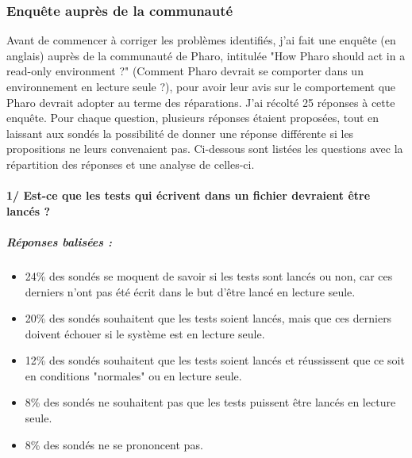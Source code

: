 \subsubsection{Enquête auprès de la communauté}
Avant de commencer à corriger les problèmes identifiés, j'ai fait une enquête (en anglais) auprès de la communauté de Pharo, intitulée "How Pharo should act in a read-only environment ?" (Comment Pharo devrait se comporter dans un environnement en lecture seule ?), pour avoir leur avis sur le comportement que Pharo devrait adopter au terme des réparations. J'ai récolté 25 réponses à cette enquête. Pour chaque question, plusieurs réponses étaient proposées, tout en laissant aux sondés la possibilité de donner une réponse différente si les propositions ne leurs convenaient pas. Ci-dessous sont listées les questions avec la répartition des réponses et une analyse de celles-ci.

\paragraph{1/ Est-ce que les tests qui écrivent dans un fichier devraient être lancés ?}
\subparagraph{Réponses balisées :}
\begin{itemize}
	\item 24\% des sondés se moquent de savoir si les tests sont lancés ou non, car ces derniers n'ont pas été écrit dans le but d'être lancé en lecture seule.
	\item 20\% des sondés souhaitent que les tests soient lancés, mais que ces derniers doivent échouer si le système est en lecture seule.
	\item 12\% des sondés souhaitent que les tests soient lancés et réussissent que ce soit en conditions "normales" ou en lecture seule.
	\item 8\% des sondés ne souhaitent pas que les tests puissent être lancés en lecture seule.
	\item 8\% des sondés ne se prononcent pas.
\end{itemize}


